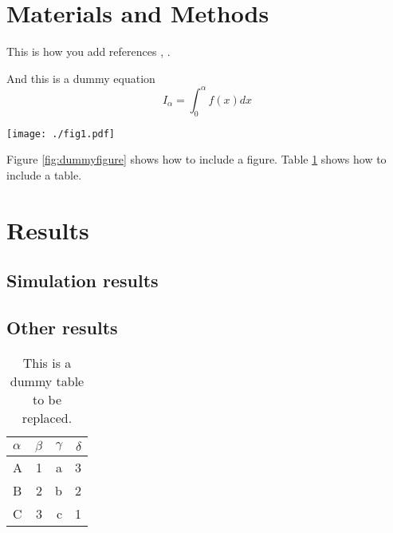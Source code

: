\documentclass[11pt,twocolumn,twoside]{article}
\begin{document}
\lipsum[2-5]


\section{Materials and Methods}

This is how you add references \cite{Doe2020}, \cite{Deen2019}.

And this is a dummy equation
\begin{equation}
I_\alpha = \int_0^\alpha f(x) dx
\end{equation}

\begin{figure*}
  \centering
  \texttt{[image: ./fig1.pdf]}
  \caption{This a dummy figure to be replaced.}
  \label{fig:dummyfigure}
\end{figure*}

Figure \ref{fig:dummyfigure} shows how to include a figure.
Table \ref{tab:dummytable} shows how to include a table.

\bigskip

\lipsum[2-7]

\section{Results}
\subsection{Simulation results}

\lipsum[2-3]

\subsection{Other results}
\lipsum[2-3]

\begin{table}
  \centering
  \begin{tabular}{lrrr}
  \toprule
  $\alpha$   & $\beta$ & $\gamma$ & $\delta$ \\
  \midrule
  A          & 1       & a        & 3        \\
  B          & 2       & b        & 2        \\
  C          & 3       & c        & 1        \\
  \bottomrule
  \end{tabular}
  \caption{This is a dummy table to be replaced.}
  \label{tab:dummytable}
\end{table}
\end{document}
